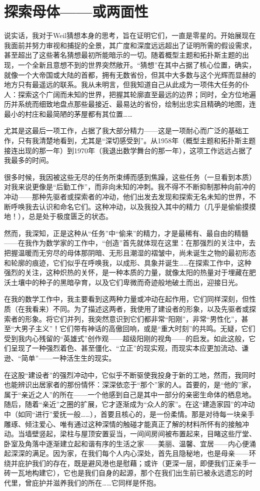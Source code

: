
\section{探索母体——或两面性}

说实话，我对于Weil猜想本身的思考，旨在证明它们，一直是零星的。开始展现在我面前并努力审视和捕捉的全景，其广度和深度远远超出了证明所需的假设需求，甚至超出了这些著名猜想最初所能暗示的一切。随着概型主题和拓扑斯主题的出现，一个全新且意想不到的世界突然敞开。“猜想”在其中占据了核心位置，确实，就像一个大帝国或大陆的首都，拥有无数省份，但其中大多数与这个光辉而显赫的地方只有最遥远的联系。我从未明言，但我知道自己从此成为一项伟大任务的仆人：探索这个广阔而未知的世界，把握其轮廓直至最远的边界；同时，全方位地遍历并系统而细致地盘点那些最接近、最易达的省份，绘制出忠实且精确的地图，连最小的村庄和最简陋的茅屋都有其位置……

尤其是这最后一项工作，占据了我大部分精力——这是一项耐心而广泛的基础工作，只有我清楚地看到，尤其是“深切感受到”。从1958年（概型主题和拓扑斯主题接连出现的那一年）到1970年（我退出数学舞台的那一年），这项工作远远占据了我最多的时间。

很多时候，我因被这些无尽的任务所束缚而感到焦躁，这些任务（一旦看到本质）对我来说更像是“后勤工作”，而非向未知的冲刺。我不得不不断抑制那种向前冲的冲动——那种先驱者或探索者的冲动，他们出发去发现和探索无名未知的世界，不断呼唤我去认识和命名它们。这种冲动，以及我投入其中的精力（几乎是偷偷摸摸地！），总是处于极度匮乏的状态。

然而，我深知，正是这种从“任务”中“偷来”的精力，才是最稀有、最自由的精髓——在我作为数学家的工作中，“创造”首先就体现在这里：在那强烈的关注中，去把握温暖而无穷尽的母体那阴暗、无形且潮湿的褶皱中，尚未诞生之物的最初形态和轮廓的痕迹，它们似乎在呼唤我，以成形、具象并诞生……在探索工作中，这种强烈的关注，这种炽热的关怀，是一种本质的力量，就像太阳的热量对于埋藏在肥沃土壤中的种子的黑暗孕育，以及它们卑微而奇迹般地破土而出，迎接日光。

在我的数学工作中，我主要看到这两种力量或冲动在起作用，它们同样深刻，但性质（在我看来）不同。为了描述这两者，我使用了建设者的形象，以及先驱者或探索者的形象。将它们并列，我突然意识到它们都非常“阳刚”，非常“男性化”，甚至“大男子主义”！它们带有神话的高傲回响，或是“重大时刻”的共鸣。无疑，它们受到我内心残留的“英雄式”创作观——超级阳刚的视角——的启发。如此这般，它们呈现了一种强烈着色、甚至僵化、“立正”的现实观，而现实本应更加流动、谦逊、“简单”——一种活生生的现实。

在这股“建设者”的强烈冲动中，它似乎不断驱使我投身于新的工地，然而，我同时也能辨识出居家者的那份情怀：深深依恋于“那个”家的人。首要的，是“他的”家，属于“亲近之人”的所在——一个他感到自己是其中一部分的亲密生命体的栖息地。随后，随着“亲近”之圈的扩展，它才逐渐成为“众人的家”。在这“建造家园”的冲动中（如同“进行”爱抚一般……），首要且核心的，是一份柔情。那是对待每一块亲手雕琢、倾注爱心、唯有通过这种深情的触碰才能真正了解的材料所怀有的接触冲动。当墙壁竖起，梁柱与屋顶安置妥当，一间间房间被布置起来，目睹这些厅堂、卧室及角落中逐渐建立起和谐有序的生活之家——美丽、温馨、宜居——内心便涌起深深的满足。因为家，在我们每个人内心深处，首先且隐秘地，也是母亲——环绕并庇护我们的存在，既是避风港也是慰藉；或许（更深一层，即便我们正亲手一砖一瓦地构建它），它也是我们自身的起源，那个在我们出生前已被永远遗忘的时代里，曾庇护并滋养我们的所在……它同样是怀抱。

